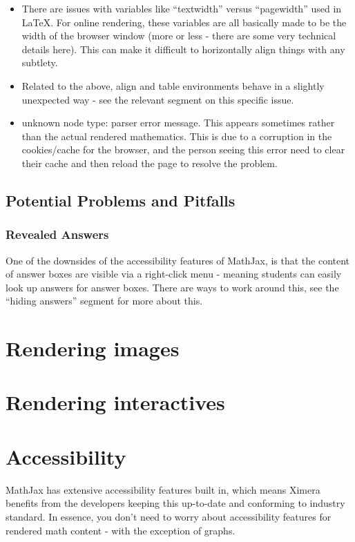 \documentclass{ximera}
\begin{document}
        \begin{itemize}
            \item There are issues with variables like ``textwidth'' versus ``pagewidth'' used in LaTeX. For online rendering, these variables are all basically made to be the width of the browser window (more or less - there are some very technical details here). This can make it difficult to horizontally align things with any subtlety.
            \item Related to the above, align and table environments behave in a slightly unexpected way - see the relevant segment on this specific issue.
            \item unknown node type: parser error message. This appears sometimes rather than the actual rendered mathematics. This is due to a corruption in the cookies/cache for the browser, and the person seeing this error need to clear their cache and then reload the page to resolve the problem.
        \end{itemize}
     
    \subsection{Potential Problems and Pitfalls}
    \subsubsection*{Revealed Answers}
        One of the downsides of the accessibility features of MathJax, is that the content of answer boxes are visible via a right-click menu - meaning students can easily look up answers for answer boxes. There are ways to work around this, see the ``hiding answers'' segment for more about this.
 
\section{Rendering images}

\section{Rendering interactives}

     
    \section{Accessibility}
        MathJax has extensive accessibility features built in, which means Ximera benefits from the developers keeping this up-to-date and conforming to industry standard. In essence, you don't need to worry about accessibility features for rendered math content - with the exception of graphs.
         
\end{document}

